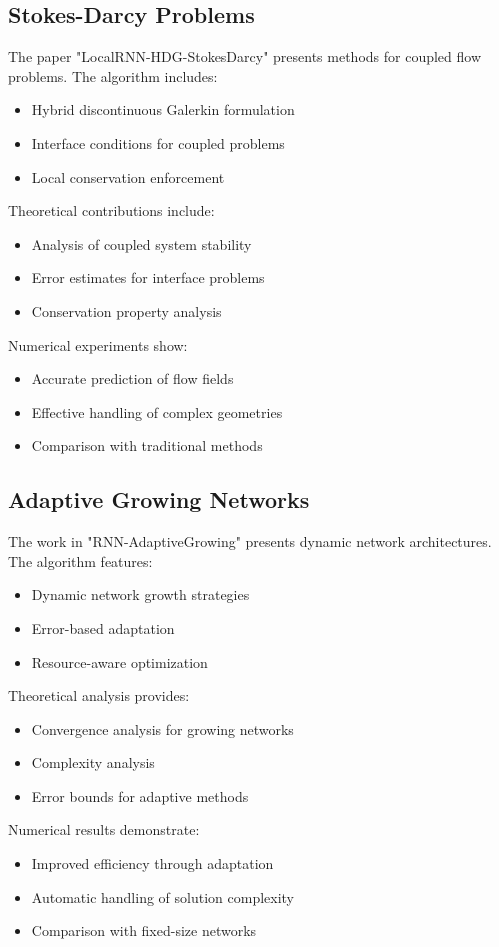 \documentclass[12pt]{article}
\begin{document}
\subsection{Stokes-Darcy Problems}
\label{subsec:local_rnn_stokes}
The paper "LocalRNN-HDG-StokesDarcy" presents methods for coupled flow problems. The algorithm includes:
\begin{itemize}
    \item Hybrid discontinuous Galerkin formulation
    \item Interface conditions for coupled problems
    \item Local conservation enforcement
\end{itemize}
Theoretical contributions include:
\begin{itemize}
    \item Analysis of coupled system stability
    \item Error estimates for interface problems
    \item Conservation property analysis
\end{itemize}
Numerical experiments show:
\begin{itemize}
    \item Accurate prediction of flow fields
    \item Effective handling of complex geometries
    \item Comparison with traditional methods
\end{itemize}

\subsection{Adaptive Growing Networks}
\label{subsec:adaptive}
The work in "RNN-AdaptiveGrowing" presents dynamic network architectures. The algorithm features:
\begin{itemize}
    \item Dynamic network growth strategies
    \item Error-based adaptation
    \item Resource-aware optimization
\end{itemize}
Theoretical analysis provides:
\begin{itemize}
    \item Convergence analysis for growing networks
    \item Complexity analysis
    \item Error bounds for adaptive methods
\end{itemize}
Numerical results demonstrate:
\begin{itemize}
    \item Improved efficiency through adaptation
    \item Automatic handling of solution complexity
    \item Comparison with fixed-size networks
\end{itemize}
\end{document}
